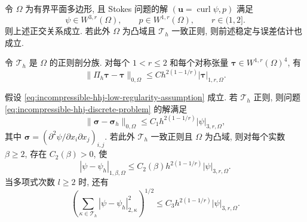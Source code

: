 \begin{Lemma}\label{lem:incompressible-hhj-low-regularity-identities}
令 $\Omega$ 为有界平面多边形, 且 Stokes 问题的解
$(\mathbf u=\operatorname{curl}\psi,p)$ 满足
\begin{equation}\label{eq:incompressible-hhj-low-regularity-assumption}
\psi\in W^{3,r}(\Omega),
\qquad p\in W^{1,r}(\Omega),
\qquad r\in(1,2].
\end{equation}
则上述正交关系成立. 若此外 $\Omega$ 为凸域且
$\mathcal T_h$ 一致正则, 则前述稳定与误差估计也成立.
\end{Lemma}

\begin{Lemma}\label{lem:incompressible-hhj-low-regularity-restriction}
令 $\mathcal T_h$ 是 $\Omega$ 的正则剖分族. 对每个
$1<r\leq2$ 和每个对称张量
$\boldsymbol\tau\in W^{1,r}(\Omega)^4$, 有
\begin{equation}\label{eq:incompressible-hhj-low-regularity-restriction}
\|\Pi_h\boldsymbol\tau-\boldsymbol\tau\|_{0,\Omega}
\leq Ch^{2(1-1/r)}|\boldsymbol\tau|_{1,r,\Omega}.
\end{equation}
\end{Lemma}

\begin{Theorem}\label{thm:incompressible-hhj-low-regularity-error}
假设 \eqref{eq:incompressible-hhj-low-regularity-assumption} 成立.
若 $\mathcal T_h$ 正则, 则问题
\eqref{eq:incompressible-hhj-discrete-problem} 的解满足
\begin{equation}\label{eq:incompressible-hhj-low-regularity-tensor-error}
\|\boldsymbol\sigma-\boldsymbol\sigma_h\|_{0,\Omega}
\leq C_1h^{2(1-1/r)}|\psi|_{3,r,\Omega},
\end{equation}
其中
$\boldsymbol\sigma=(\partial^2\psi/\partial x_i\partial x_j)_{i,j}$.
若此外 $\mathcal T_h$ 一致正则且 $\Omega$ 为凸域,
则对每个实数 $\beta\geq2$, 存在 $C_2(\beta)>0$, 使
\begin{equation}\label{eq:incompressible-hhj-low-regularity-w1beta-error}
|\psi-\psi_h|_{1,\beta,\Omega}
\leq C_2(\beta)h^{2(1-1/r)}|\psi|_{3,r,\Omega}.
\end{equation}
当多项式次数 $l\geq2$ 时, 还有
\begin{equation}\label{eq:incompressible-hhj-low-regularity-piecewise-h2-error}
\left(\sum_{\kappa\in\mathcal T_h}
|\psi-\psi_h|_{2,\kappa}^2\right)^{1/2}
\leq C_3h^{2(1-1/r)}|\psi|_{3,r,\Omega}.
\end{equation}
\end{Theorem}

